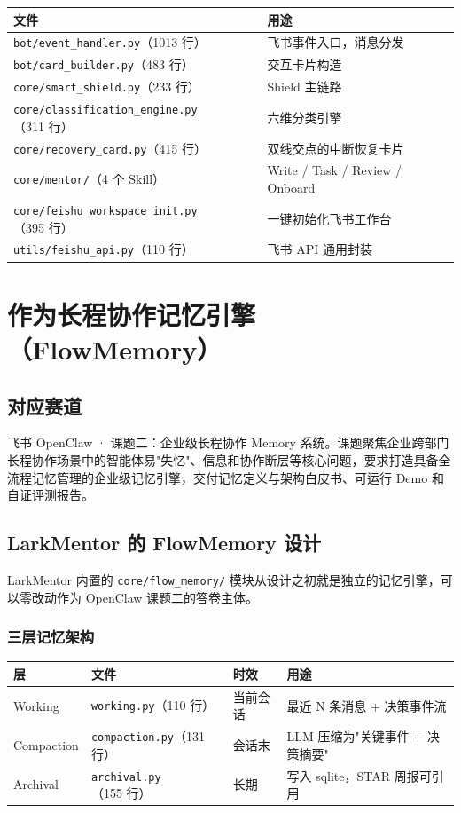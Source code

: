 \documentclass[11pt,a4paper]{ctexart}
\begin{document}
{\small
\begin{tabular}{>{\raggedright\arraybackslash}p{6.4cm}p{7.6cm}}
\toprule
\textbf{文件} & \textbf{用途} \\
\midrule
\texttt{bot/event\_handler.py}（1013 行） & 飞书事件入口，消息分发 \\
\texttt{bot/card\_builder.py}（483 行） & 交互卡片构造 \\
\texttt{core/smart\_shield.py}（233 行） & Shield 主链路 \\
\texttt{core/classification\_engine.py}（311 行） & 六维分类引擎 \\
\texttt{core/recovery\_card.py}（415 行） & 双线交点的中断恢复卡片 \\
\texttt{core/mentor/}（4 个 Skill） & Write / Task / Review / Onboard \\
\texttt{core/feishu\_workspace\_init.py}（395 行） & 一键初始化飞书工作台 \\
\texttt{utils/feishu\_api.py}（110 行） & 飞书 API 通用封装 \\
\bottomrule
\end{tabular}
}

\section{作为长程协作记忆引擎（FlowMemory）}

\subsection{对应赛道}
飞书 OpenClaw · 课题二：企业级长程协作 Memory 系统。课题聚焦企业跨部门长程协作场景中的智能体易"失忆"、信息和协作断层等核心问题，要求打造具备全流程记忆管理的企业级记忆引擎，交付记忆定义与架构白皮书、可运行 Demo 和自证评测报告。

\subsection{LarkMentor 的 FlowMemory 设计}

LarkMentor 内置的 \texttt{core/flow\_memory/} 模块从设计之初就是独立的记忆引擎，可以零改动作为 OpenClaw 课题二的答卷主体。

\subsubsection{三层记忆架构}

{\small
\begin{tabular}{p{2.2cm}>{\raggedright\arraybackslash}p{3.6cm}p{2.4cm}p{5.6cm}}
\toprule
\textbf{层} & \textbf{文件} & \textbf{时效} & \textbf{用途} \\
\midrule
Working & \texttt{working.py}（110 行） & 当前会话 & 最近 N 条消息 + 决策事件流 \\
Compaction & \texttt{compaction.py}（131 行） & 会话末 & LLM 压缩为"关键事件 + 决策摘要" \\
Archival & \texttt{archival.py}（155 行） & 长期 & 写入 sqlite，STAR 周报可引用 \\
\bottomrule
\end{tabular}
}
\end{document}
